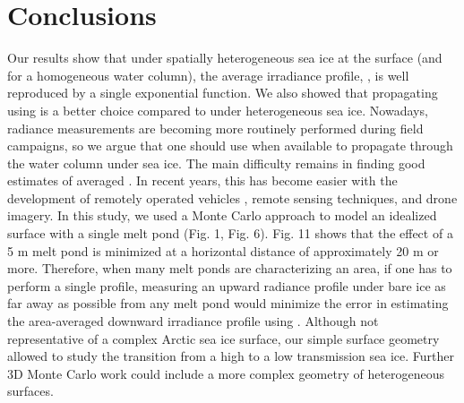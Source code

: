 \section{Conclusions}

Our results show that under spatially heterogeneous sea ice at the surface (and for a homogeneous water column), the average irradiance profile, \meanedz{}, is well reproduced by a single exponential function. We also showed that propagating \edzero{} using \klu{} is a better choice compared to \ked{} under heterogeneous sea ice. Nowadays, radiance measurements are becoming more routinely performed during field campaigns, so we argue that one should use \klu{} when available to propagate \edzero{} through the water column under sea ice. The main difficulty remains in finding good estimates of averaged \edzero{}. In recent years, this has become easier with the development of remotely operated vehicles \citep{Katlein2015, Arndt2017, Nicolaus2013}, remote sensing techniques, and drone imagery. In this study, we used a Monte Carlo approach to model an idealized surface with a single melt pond (Fig. 1, Fig. 6). Fig. 11 shows that the effect of a 5 m melt pond is minimized at a horizontal distance of approximately 20 m or more. Therefore, when many melt ponds are characterizing an area, if one has to perform a single profile, measuring an upward radiance profile under bare ice as far away as possible from any melt pond would minimize the error in estimating the area-averaged downward irradiance profile using \klu{}. Although not representative of a complex Arctic sea ice surface, our simple surface geometry allowed to study the transition from a high to a low transmission sea ice. Further 3D Monte Carlo work could include a more complex geometry of heterogeneous surfaces.